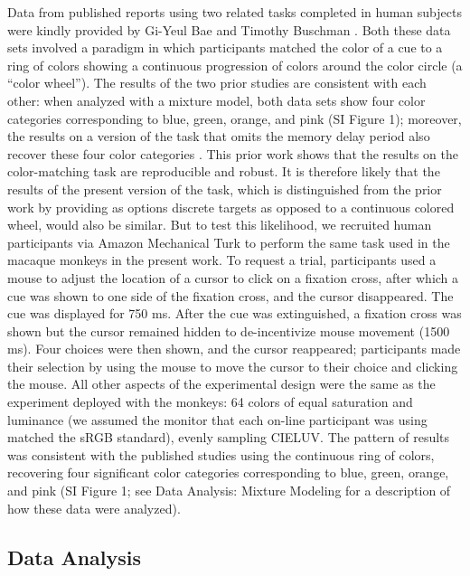 Data from published reports using two related tasks completed in human subjects were kindly provided by Gi-Yeul Bae \citep{bae_why_2015} and Timothy Buschman \citep{panichello_error-correcting_2019}.
Both these data sets involved a paradigm in which participants matched the color of a cue to a ring of colors showing a continuous progression of colors around the color circle (a ``color wheel''). 
The results of the two prior studies are consistent with each other: when analyzed with a mixture model, both data sets show four color categories corresponding to blue, green, orange, and pink (SI Figure 1); moreover, the results on a version of the task that omits the memory delay period also recover these four color categories \citep{bae_why_2015}.
This prior work shows that the results on the color-matching task are reproducible and robust. 
It is therefore likely that the results of the present version of the task, which is distinguished from the prior work by providing as options discrete targets as opposed to a continuous colored wheel, would also be similar. 
But to test this likelihood, we recruited human participants via Amazon Mechanical Turk to perform the same task used in the macaque monkeys in the present work. 
To request a trial, participants used a mouse to adjust the location of a cursor to click on a fixation cross, after which a cue was shown to one side of the fixation cross, and the cursor disappeared. The cue was displayed for 750 ms. 
After the cue was extinguished, a fixation cross was shown but the cursor remained hidden to de-incentivize mouse movement (1500 ms). Four choices were then shown, and the cursor reappeared; participants made their selection by using the mouse to move the cursor to their choice and clicking the mouse. 
All other aspects of the experimental design were the same as the experiment deployed with the monkeys: 64 colors of equal saturation and luminance (we assumed the monitor that each on-line participant was using matched the sRGB standard), evenly sampling CIELUV. 
The pattern of results was consistent with the published studies using the continuous ring of colors, recovering four significant color categories corresponding to blue, green, orange, and pink (SI Figure 1; see Data Analysis: Mixture Modeling for a description of how these data were analyzed). %

\subsection{Data Analysis}

